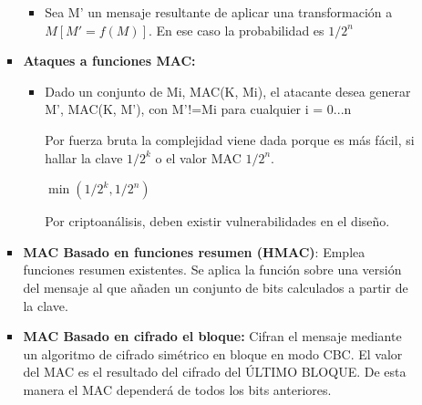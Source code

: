 \documentclass[12pt, twoside, openright]{report} %
\begin{document}
\begin{itemize}
\begin{itemize}
\begin{itemize}
\begin{itemize}
        \item Sea M' un mensaje resultante de aplicar una transformación a
         $ M[M'= f(M)]$. En ese caso la probabilidad es $1/2^n$
          
        \end{itemize}
      \item \textbf{Ataques a funciones MAC:}
        

        \begin{itemize}
        \item Dado un conjunto de Mi, MAC(K, Mi), el atacante desea generar
          M', MAC(K, M'), con M'!=Mi para cualquier i = 0...n
          

          
		  
            Por fuerza bruta la complejidad viene dada porque es más
            fácil, si hallar la clave $1/2^k$ o el valor MAC $1/2^n$.
          
			
            \textbf{\underline{$\min(1/2^k, 1/2^n)$}}
         
			
            Por criptoanálisis, deben existir vulnerabilidades en el
            diseño.
 
			
        \end{itemize}
      \item \textbf{MAC Basado en funciones resumen (HMAC)}: Emplea
        funciones resumen existentes. Se aplica la función sobre una
        versión del mensaje al que añaden un conjunto de bits calculados
        a partir de la clave.
        
      \item \textbf{MAC Basado en cifrado el bloque:} Cifran el mensaje
        mediante un algoritmo de cifrado simétrico en bloque en modo
        CBC. El valor del MAC es el resultado del cifrado del ÚLTIMO
        BLOQUE. De esta manera el MAC dependerá de todos los bits
        anteriores.
        
      \end{itemize}
    \end{itemize}
  \end{itemize}
\end{document}
